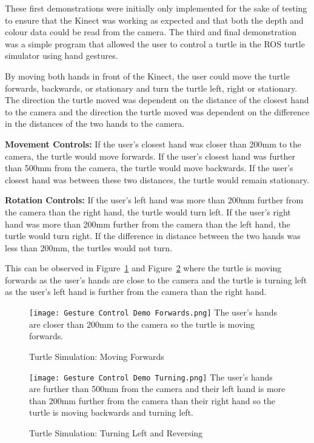 These first demonstrations were initially only implemented for the sake of testing to ensure that the Kinect was working as expected and that both the depth and colour data could be read from the camera.
The third and final demonstration was a simple program that allowed the user to control a turtle in the ROS turtle simulator using hand gestures.

By moving both hands in front of the Kinect, the user could move the turtle forwards, backwards, or stationary and turn the turtle left, right or stationary.
The direction the turtle moved was dependent on the distance of the closest hand to the camera and the direction the turtle moved was dependent on the difference in the distances of the two hands to the camera.

\textbf{Movement Controls:}\newline
If the user's closest hand was closer than 200mm to the camera, the turtle would move forwards.\newline
If the user's closest hand was further than 500mm from the camera, the turtle would move backwards.\newline
If the user's closest hand was between these two distances, the turtle would remain stationary.

\textbf{Rotation Controls:}\newline
If the user's left hand was more than 200mm further from the camera than the right hand, the turtle would turn left.\newline
If the user's right hand was more than 200mm further from the camera than the left hand, the turtle would turn right.\newline
If the difference in distance between the two hands was less than 200mm, the turtles would not turn.

This can be observed in Figure~\ref{fig:turtle_fwd} and Figure~\ref{fig:turtle_turn} where the turtle is moving forwards as the user's hands are close to the camera and the turtle is turning left as the user's left hand is further from the camera than the right hand.

\begin{figure}[!htb]
    \caption{Turtle Simulation: Moving Forwards}
    \texttt{[image: Gesture Control Demo Forwards.png]}
    \small
    The user's hands are closer than 200mm to the camera so the turtle is moving forwards.
    \label{fig:turtle_fwd}
\end{figure}

\begin{figure}[!htb]
    \caption{Turtle Simulation: Turning Left and Reversing}
    \texttt{[image: Gesture Control Demo Turning.png]}
    \small
    The user's hands are further than 500mm from the camera and their left hand is more than 200mm further from the camera than their right hand so the turtle is moving backwards and turning left.
    \label{fig:turtle_turn}
\end{figure}

